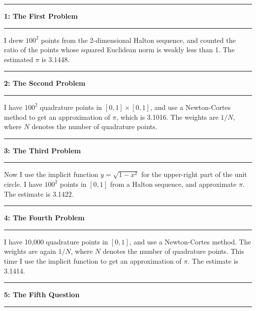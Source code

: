 \documentclass[10pt]{article}
\newcommand\question[2]{\vspace{.25in}\hrule\textbf{#1: #2}\vspace{.5em}\hrule\vspace{.10in}}
\begin{document}
\raggedright
\newcommand\NAME{Motoaki Takahashi}  %
\newcommand\ANDREWID{mxt323}     %
\newcommand\HWNUM{3}              %


\question{1}{The First Problem} 
I drew $100^2$ points from the 2-dimensional Halton sequence, and counted the ratio of the points whose squared Euclidean norm is weakly less than 1. The estimated $\pi$ is 3.1448.



\question{2}{The Second Problem}
I have $100^2$ quadrature points in $[0, 1]\times[0, 1]$, and use a Newton-Cortes method to get an approximation of $\pi$, which is 3.1016. The weights are $1/N$, where $N$ denotes the number of quadrature points.

\question{3}{The Third Problem}
Now I use the implicit function $y=\sqrt{1-x^2}$ for the upper-right part of the unit circle. I have $100^2$ points in $[0, 1]$ from a Halton sequence, and approximate $\pi$. The estimate is 3.1422.

\question{4}{The Fourth Problem}
I have 10,000 quadrature points in $[0, 1]$, and use a Newton-Cortes method. The weights are again $1/N$, where $N$ denotes the number of quadrature points. This time I use the implicit function to get an approximation of $\pi$. The estimate is 3.1414.

\question{5}{The Fifth Question}
\end{document}
